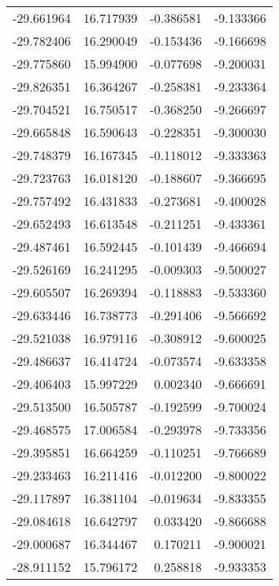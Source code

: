 \begin{tabular}{rrrr}
      -29.661964 &        16.717939 &   -0.386581 &  -9.133366 \\
      -29.782406 &        16.290049 &   -0.153436 &  -9.166698 \\
      -29.775860 &        15.994900 &   -0.077698 &  -9.200031 \\
      -29.826351 &        16.364267 &   -0.258381 &  -9.233364 \\
      -29.704521 &        16.750517 &   -0.368250 &  -9.266697 \\
      -29.665848 &        16.590643 &   -0.228351 &  -9.300030 \\
      -29.748379 &        16.167345 &   -0.118012 &  -9.333363 \\
      -29.723763 &        16.018120 &   -0.188607 &  -9.366695 \\
      -29.757492 &        16.431833 &   -0.273681 &  -9.400028 \\
      -29.652493 &        16.613548 &   -0.211251 &  -9.433361 \\
      -29.487461 &        16.592445 &   -0.101439 &  -9.466694 \\
      -29.526169 &        16.241295 &   -0.009303 &  -9.500027 \\
      -29.605507 &        16.269394 &   -0.118883 &  -9.533360 \\
      -29.633446 &        16.738773 &   -0.291406 &  -9.566692 \\
      -29.521038 &        16.979116 &   -0.308912 &  -9.600025 \\
      -29.486637 &        16.414724 &   -0.073574 &  -9.633358 \\
      -29.406403 &        15.997229 &    0.002340 &  -9.666691 \\
      -29.513500 &        16.505787 &   -0.192599 &  -9.700024 \\
      -29.468575 &        17.006584 &   -0.293978 &  -9.733356 \\
      -29.395851 &        16.664259 &   -0.110251 &  -9.766689 \\
      -29.233463 &        16.211416 &   -0.012200 &  -9.800022 \\
      -29.117897 &        16.381104 &   -0.019634 &  -9.833355 \\
      -29.084618 &        16.642797 &    0.033420 &  -9.866688 \\
      -29.000687 &        16.344467 &    0.170211 &  -9.900021 \\
      -28.911152 &        15.796172 &    0.258818 &  -9.933353 \\

\end{tabular}
